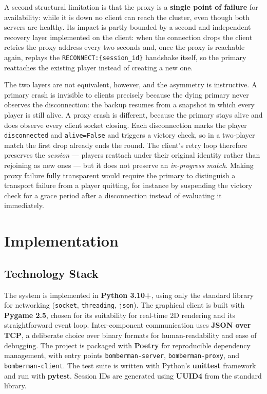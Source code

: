 \documentclass{scrartcl}
\begin{document}
A second structural limitation is that the proxy is a \textbf{single point of
failure} for availability: while it is down no client can reach the cluster, even
though both servers are healthy. Its impact is partly bounded by a second and
independent recovery layer implemented on the client: when the connection drops
the client retries the proxy address every two seconds and, once the proxy is
reachable again, replays the \texttt{RECONNECT:\{session\_id\}} handshake itself,
so the primary reattaches the existing player instead of creating a new one.

The two layers are not equivalent, however, and the asymmetry is instructive. A
primary crash is invisible to clients precisely because the dying primary never
observes the disconnection: the backup resumes from a snapshot in which every
player is still alive. A proxy crash is different, because the primary stays alive
and does observe every client socket closing. Each disconnection marks the player
\texttt{disconnected} and \texttt{alive=False} and triggers a victory check, so in
a two-player match the first drop already ends the round. The client's retry loop
therefore preserves the \emph{session} --- players reattach under their original
identity rather than rejoining as new ones --- but it does not preserve an
\emph{in-progress match}. Making proxy failure fully transparent would require the
primary to distinguish a transport failure from a player quitting, for instance by
suspending the victory check for a grace period after a disconnection instead of
evaluating it immediately.

\section{Implementation}\label{implementation}

\subsection{Technology Stack}

The system is implemented in \textbf{Python 3.10+}, using only the standard library for networking (\texttt{socket}, \texttt{threading}, \texttt{json}).
The graphical client is built with \textbf{Pygame 2.5}, chosen for its suitability for real-time 2D rendering and its straightforward event loop.
Inter-component communication uses \textbf{JSON over TCP}, a deliberate choice over binary formats for human-readability and ease of debugging.
The project is packaged with \textbf{Poetry}  for reproducible dependency management, with entry points \texttt{bomberman-server}, \texttt{bomberman-proxy}, and \texttt{bomberman-client}.
The test suite is written with Python's \textbf{unittest} framework and run with \textbf{pytest}.
Session IDs are generated using \textbf{UUID4} from the standard library.
\end{document}
